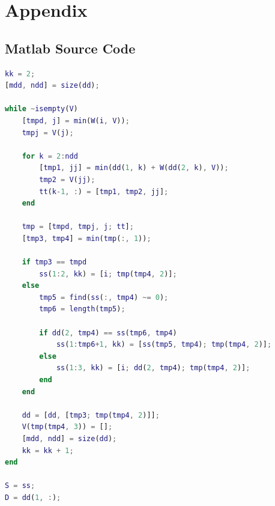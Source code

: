 \documentclass[12pt]{article}
\begin{document}
\newpage
\section{Appendix}

\subsection{Matlab Source Code}
\begin{lstlisting}[language=matlab,caption={The MATLAB Source code of Algorithm}]
% Parameter initialization
kk = 2;
[mdd, ndd] = size(dd);

while ~isempty(V)
    [tmpd, j] = min(W(i, V));
    tmpj = V(j);
    
    for k = 2:ndd
        [tmp1, jj] = min(dd(1, k) + W(dd(2, k), V));
        tmp2 = V(jj);
        tt(k-1, :) = [tmp1, tmp2, jj];
    end
    
    tmp = [tmpd, tmpj, j; tt];
    [tmp3, tmp4] = min(tmp(:, 1));
    
    if tmp3 == tmpd
        ss(1:2, kk) = [i; tmp(tmp4, 2)];
    else
        tmp5 = find(ss(:, tmp4) ~= 0);
        tmp6 = length(tmp5);
        
        if dd(2, tmp4) == ss(tmp6, tmp4)
            ss(1:tmp6+1, kk) = [ss(tmp5, tmp4); tmp(tmp4, 2)];
        else
            ss(1:3, kk) = [i; dd(2, tmp4); tmp(tmp4, 2)];
        end
    end
    
    dd = [dd, [tmp3; tmp(tmp4, 2)]];
    V(tmp(tmp4, 3)) = [];
    [mdd, ndd] = size(dd);
    kk = kk + 1;
end

S = ss;
D = dd(1, :);
\end{lstlisting}
\end{document}
